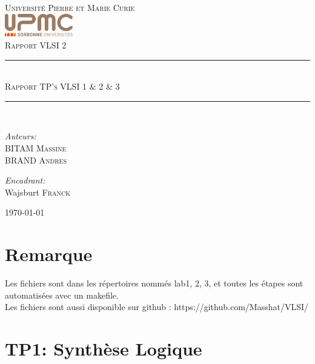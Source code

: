 \documentclass[12pt]{article}
\newcommand{\HRule}{\rule{\linewidth}{0.5mm}}
\begin{document}
\begin{titlepage}
  \begin{center}
    \textsc{\LARGE Université Pierre et Marie Curie}\\[1.5cm]
    \includegraphics[height=1cm]{upmc.png}\\[1.5cm]
    \textsc{\Large Rapport VLSI 2 }\\[2cm]

    \HRule \\[1cm]
    \textsc{\huge Rapport TP's VLSI 1 \& 2 \& 3 }\\[0.5cm]
    \HRule \\[1cm]

    \noindent
    \begin{minipage}[t]{0.55\textwidth}
      \begin{flushleft} \large
        \emph{Auteurs:}\\
        BITAM \textsc{Massine}\\
        BRAND \textsc{Andres}
      \end{flushleft}
    \end{minipage}%
    \begin{minipage}[t]{0.47\textwidth}
      \begin{flushright} \large
        \emph{Encadrant:} \\
        Wajsburt \textsc{Franck}
      \end{flushright}
    \end{minipage}

    \vfill

    {\large \today}
  \end{center}
  \newpage
  \tableofcontents
  \newpage
  \listoffigures
  \newpage
\end{titlepage}
\section{Remarque}
Les fichiers sont dans les répertoires nommés lab1, 2, 3, et toutes les étapes sont automatisées avec un makefile.\\
Les fichiers sont aussi disponible sur github : https://github.com/Masshat/VLSI/
\section{TP1: Synthèse Logique}
\end{document}
